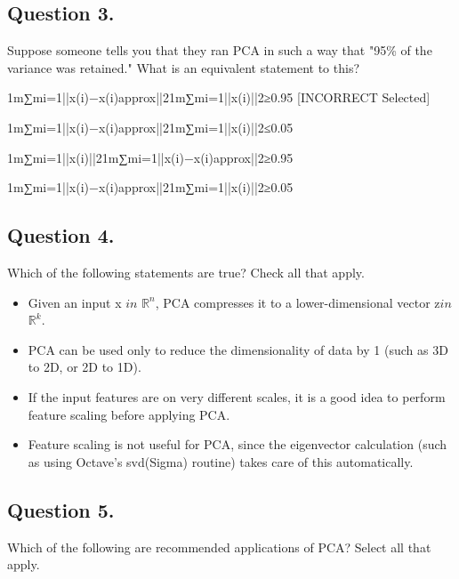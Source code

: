 \subsection{ Question 3. }
Suppose someone tells you that they ran PCA in such a way that "95\% of the variance was retained." What is an equivalent statement to this?

1m∑mi=1||x(i)−x(i)approx||21m∑mi=1||x(i)||2≥0.95 [INCORRECT Selected]

1m∑mi=1||x(i)−x(i)approx||21m∑mi=1||x(i)||2≤0.05

1m∑mi=1||x(i)||21m∑mi=1||x(i)−x(i)approx||2≥0.95

1m∑mi=1||x(i)−x(i)approx||21m∑mi=1||x(i)||2≥0.05

\subsection{ Question 4. }
Which of the following statements are true? Check all that apply.

\begin{itemize}
\item Given an input x $in$ $\mathbb{R}^n$, PCA compresses it to a lower-dimensional vector z$in$ $\mathbb{R}^k$.

\item PCA can be used only to reduce the dimensionality of data by 1 (such as 3D to 2D, or 2D to 1D).

\item If the input features are on very different scales, it is a good idea to perform feature scaling before applying PCA.

\item Feature scaling is not useful for PCA, since the eigenvector calculation (such as using Octave's svd(Sigma) routine) takes care of this automatically.
\end{itemize}
\subsection{ Question 5. }
Which of the following are recommended applications of PCA? Select all that apply.

